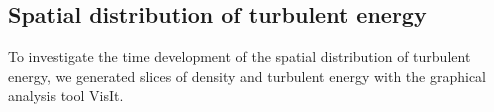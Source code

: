 \subsection{Spatial distribution of turbulent energy}
To investigate the time development of the spatial distribution of turbulent
energy, we generated slices of density and turbulent energy with the graphical
analysis tool VisIt. 
\begin{figure}[tp]
\centering
{}
\end{figure}
